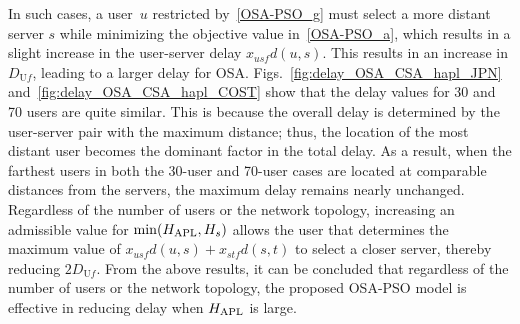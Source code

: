 \documentclass[10pt, letterpaper]{IEEEtran}
\begin{document}
\begin{CJK}{UTF8}{ipxm}
In such cases, a user~$u$ restricted by~\eqref{OSA-PSO_g} must select a more distant server $s$ while minimizing the objective value in~\eqref{OSA-PSO_a}, which results in a slight increase in the user-server delay $x_{usf}d(u,s)$.
This results in an increase in $D_{\mathrm{U}f}$, leading to a larger delay for OSA.
Figs.~\ref{fig:delay_OSA_CSA_hapl_JPN} and~\ref{fig:delay_OSA_CSA_hapl_COST} show that the delay values for 30 and 70 users are quite similar.
This is because the overall delay is determined by the user-server pair with the maximum distance; thus, the location of the most distant user becomes the dominant factor in the total delay.
As a result, when the farthest users in both the 30-user and 70-user cases are located at comparable distances from the servers, the maximum delay remains nearly unchanged.
Regardless of the number of users or the network topology, increasing an admissible value for $\min(H_{\rm APL}, H_s)$ allows the user that determines the maximum value of $x_{usf}d(u,s) + x_{stf}d(s,t)$ to select a closer server, thereby reducing $2D_{\mathrm{U}f}$.
From the above results, it can be concluded that regardless of the number of users or the network topology, the proposed OSA-PSO model is effective in reducing delay when $H_{\rm APL}$ is large.


\end{CJK}
\end{document}
